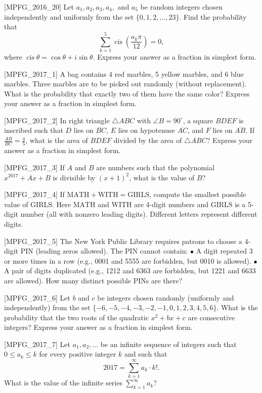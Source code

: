 [MPFG_2016_20]
Let $a_1, a_2, a_3, a_4,$ and $a_5$ be random integers chosen independently and uniformly from the set $\{0,1,2,\dots,23\}$. Find the probability that
$$\sum_{k=1}^5 \operatorname{cis}\left(\frac{a_k \pi}{12}\right) = 0,$$
where $\operatorname{cis}\theta = \cos\theta + i\sin\theta$. Express your answer as a fraction in simplest form.

[MPFG_2017_1]
A bag contains 4 red marbles, 5 yellow marbles, and 6 blue marbles. Three marbles are to be picked out randomly (without replacement). What is the probability that exactly two of them have the same color? Express your answer as a fraction in simplest form.

[MPFG_2017_2]
In right triangle $\triangle ABC$ with $\angle B = 90^\circ$, a square $BDEF$ is inscribed such that $D$ lies on $\overline{BC}$, $E$ lies on hypotenuse $\overline{AC}$, and $F$ lies on $\overline{AB}$. If $\frac{AB}{BC} = \frac{4}{5}$, what is the area of $BDEF$ divided by the area of $\triangle ABC$? Express your answer as a fraction in simplest form.

[MPFG_2017_3]
If $A$ and $B$ are numbers such that the polynomial $x^{2017} + Ax + B$ is divisible by $(x+1)^2$, what is the value of $B$?

[MPFG_2017_4]
If $\text{MATH} + \text{WITH} = \text{GIRLS}$, compute the smallest possible value of $\text{GIRLS}$. Here $\text{MATH}$ and $\text{WITH}$ are 4-digit numbers and $\text{GIRLS}$ is a 5-digit number (all with nonzero leading digits). Different letters represent different digits.

[MPFG_2017_5]
The New York Public Library requires patrons to choose a 4-digit PIN (leading zeros allowed). The PIN cannot contain:
$\bullet$ A digit repeated 3 or more times in a row (e.g., 0001 and 5555 are forbidden, but 0010 is allowed).
$\bullet$ A pair of digits duplicated (e.g., 1212 and 6363 are forbidden, but 1221 and 6633 are allowed).
How many distinct possible PINs are there?

[MPFG_2017_6]
Let $b$ and $c$ be integers chosen randomly (uniformly and independently) from the set $\{-6,-5,-4,-3,-2,-1,0,1,2,3,4,5,6\}$. What is the probability that the two roots of the quadratic $x^2 + bx + c$ are consecutive integers? Express your answer as a fraction in simplest form.

[MPFG_2017_7]
Let $a_1, a_2, \dots$ be an infinite sequence of integers such that $0 \le a_k \le k$ for every positive integer $k$ and such that
$$2017 = \sum_{k=1}^\infty a_k \cdot k!.$$
What is the value of the infinite series $\sum_{k=1}^\infty a_k$?

